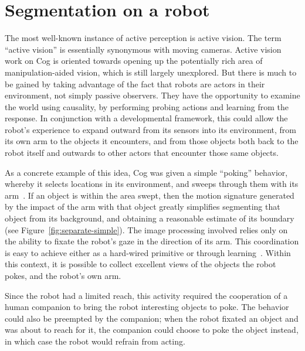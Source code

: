 
\section{Segmentation on a robot}

\label{sect:poking}


The most well-known instance of active perception is active vision.
The term ``active vision'' is essentially synonymous with moving
cameras.  Active vision work on Cog is oriented towards opening up the
potentially rich area of manipulation-aided vision, which is still
largely unexplored.
%
But there is much to be gained by taking advantage of the fact that
robots are actors in their environment, not simply passive observers.
They have the opportunity to examine the world using causality, by
performing probing actions and learning from the response.  
In conjunction with a developmental framework, this could allow the robot's
experience to expand outward from its sensors into its environment,
from its own arm to the objects it encounters, and from those objects
both back to the robot itself and outwards to other actors that
encounter those same objects.


As a concrete example of this idea,
Cog was given a simple ``poking'' behavior, whereby it selects
locations in its environment, and sweeps through
them with its arm~\cite[]{fitzpatrick02towards}.
%
If an object is within the area swept, then the motion signature
generated by the impact of the arm with that object greatly simplifies
segmenting that object from its background, and obtaining a reasonable
estimate of its boundary (see Figure~\ref{fig:separate-simple}).
%
The image processing involved
relies only on the ability to fixate the robot's gaze in the
direction of its arm.
This coordination is easy to achieve either as a hard-wired primitive
or through learning~\cite[]{fitzpatrick02towards}.  Within this context,
it is possible to collect excellent views of the objects the robot
pokes, and the robot's own arm.


Since the robot had a limited reach,
this activity required the cooperation of a human
companion to bring the robot interesting objects to poke.
The behavior could also be preempted by the companion; when the robot
fixated an object and was about to reach for it, the companion
could choose to poke the object instead, in which case the robot
would refrain from acting.

